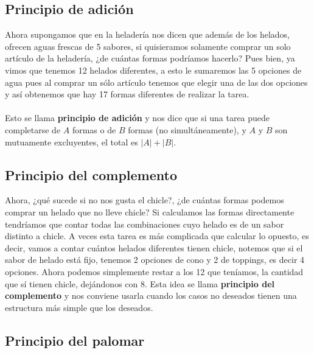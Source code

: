 \subsection*{Principio de adición}
Ahora supongamos que en la heladería nos dicen que además de los helados, ofrecen aguas frescas de 5 sabores, si quisieramos solamente comprar un solo artículo de la heladería, ¿de cuántas formas podríamos hacerlo? Pues bien, ya vimos que tenemos 12 helados diferentes, a esto le sumaremos las 5 opciones de agua pues al comprar un sólo artículo tenemos que elegir una de las dos opciones y así obtenemos que hay 17 formas diferentes de realizar la tarea.
\\\\Esto se llama \textbf{principio de adición} y nos dice que si una tarea puede completarse de $A$ formas o de $B$ formas (no simultáneamente), y $A$ y $B$ son mutuamente excluyentes, el total es $|A| + |B|$.
 
\subsection*{Principio del complemento}

Ahora, ¿qué sucede si no nos gusta el chicle?, ¿de cuántas formas podemos comprar un helado que no lleve chicle? Si calculamos las formas directamente tendríamos que contar todas las combinaciones cuyo helado es de un sabor distinto a chicle. A veces esta tarea es más complicada que calcular lo opuesto, es decir, vamos a contar cuántos helados diferentes tienen chicle, notemos que si el sabor de helado está fijo, tenemos 2 opciones de cono y 2 de toppings, es decir 4 opciones. Ahora podemos simplemente restar a los 12 que teníamos, la cantidad que sí tienen chicle, dejándonos con 8. Esta idea se llama \textbf{principio del complemento} y nos conviene usarla cuando los casos no deseados tienen una estructura más simple que los deseados.
 
\subsection*{Principio del palomar}

